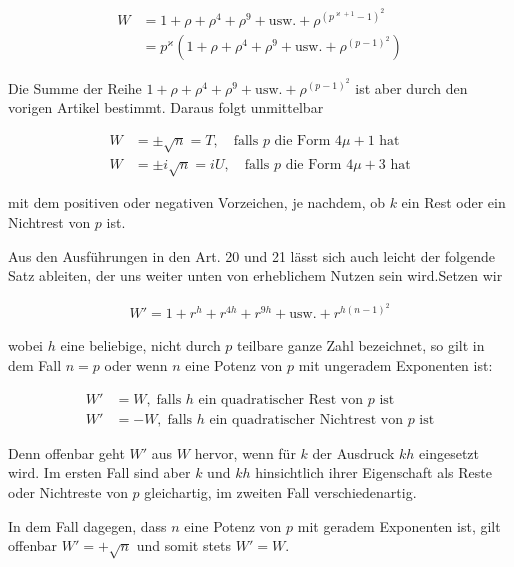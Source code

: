 \[
\begin{aligned}
W&=1+\rho+\rho^4+\rho^9+\text{usw.}+\rho^{(p^{\varkappa+1}-1)^2}\\&=p^\varkappa(1+\rho+\rho^4+\rho^9+\text{usw.}+\rho^{(p-1)^2})
\end{aligned}
\]

Die Summe der Reihe $1+\rho+\rho^4+\rho^9+\text{usw.}+\rho^{(p-1)^2}$ ist aber durch den vorigen Artikel bestimmt. Daraus folgt unmittelbar

\[
\begin{aligned}
W&=\pm\surd n=T,\quad\text{falls }p\text{ die Form }4\mu+1\text{ hat}\\
W&=\pm i\surd n=iU,\quad\text{falls }p\text{ die Form }4\mu+3\text{ hat}
\end{aligned}
\]

mit dem positiven oder negativen Vorzeichen, je nachdem, ob $k$ ein Rest oder ein Nichtrest von $p$ ist.


Aus den Ausführungen in den Art. 20 und 21 lässt sich auch leicht der folgende Satz ableiten, der uns weiter unten von erheblichem Nutzen sein wird.\quad Setzen wir

\[
\begin{aligned}
W'=1+r^h+r^{4h}+r^{9h}+\text{usw.}+r^{h(n-1)^2}
\end{aligned}
\]


wobei $h$ eine beliebige, nicht durch $p$ teilbare ganze Zahl bezeichnet, so gilt in dem Fall $n=p$ oder wenn $n$ eine Potenz von $p$ mit ungeradem Exponenten ist:

\[
\begin{aligned}
W'&=W,\;\text{falls }h\text{ ein quadratischer Rest von }p\text{ ist}\\
W'&=-W,\;\text{falls }h\text{ ein quadratischer Nichtrest von }p\text{ ist}
\end{aligned}
\]

Denn offenbar geht $W'$ aus $W$ hervor, wenn für $k$ der Ausdruck $kh$ eingesetzt wird. Im ersten Fall sind aber $k$ und $kh$ hinsichtlich ihrer Eigenschaft als Reste oder Nichtreste von $p$ gleichartig, im zweiten Fall verschiedenartig.

In dem Fall dagegen, dass $n$ eine Potenz von $p$ mit geradem Exponenten ist, gilt offenbar $W'=+\surd n$ und somit stets $W'=W$.


